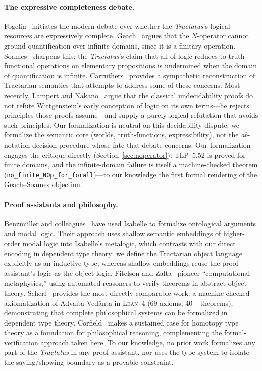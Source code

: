 \documentclass[jsl,bibother]{asl}
\theoremstyle{definition}
\theoremstyle{remark}
\newcommand{\Lean}{\textsc{Lean}}
\begin{document}
\paragraph{The expressive completeness debate.}
Fogelin~\cite{fogelin1987} initiates the modern debate over
whether the \emph{Tractatus}'s logical resources are
expressively complete.  Geach~\cite{geach1981} argues that the
$N$-operator cannot ground quantification over infinite domains,
since it is a finitary operation.
Soames~\cite{soames1983} sharpens this: the \emph{Tractatus}'s
claim that all of logic reduces to truth-functional operations
on elementary propositions is undermined when the domain of
quantification is infinite.
Carruthers~\cite{carruthers1989} provides a sympathetic
reconstruction of Tractarian semantics that attempts to address
some of these concerns.
Most recently, Lampert and Nakano~\cite{lampert2025} argue that
the classical undecidability proofs do not refute Wittgenstein's
early conception of logic on its own terms---he rejects
principles those proofs assume---and supply a purely logical
refutation that avoids such principles.  Our formalization is
neutral on this decidability dispute: we formalize the semantic
core (worlds, truth-functions, expressibility), not the
\emph{ab}-notation decision procedure whose fate that debate
concerns.
Our formalization engages the critique directly
(Section~\ref{sec:noperator}): TLP~5.52 is proved for finite
domains, and the infinite-domain failure is itself a
machine-checked theorem
(\texttt{no\_finite\_NOp\_for\_forall})---to our knowledge the
first formal rendering of the Geach--Soames objection.

\paragraph{Proof assistants and philosophy.}
Benzm\"uller and colleagues~\cite{benzmuller2017} have used
Isabelle to formalize ontological arguments and modal logic.
Their approach uses shallow semantic embeddings of higher-order
modal logic into Isabelle's metalogic, which contrasts with our
direct encoding in dependent type theory: we define the
Tractarian object language explicitly as an inductive type,
whereas shallow embeddings reuse the proof assistant's logic
as the object logic.
Fitelson and Zalta~\cite{fitelson2007} pioneer ``computational
metaphysics,'' using automated reasoners to verify theorems
in abstract-object theory.
Scherf~\cite{scherf2025} provides the most directly comparable
work: a machine-checked axiomatization of Advaita Ved\=anta in
\Lean~4 (69 axioms, 40+ theorems), demonstrating that complete
philosophical systems can be formalized in dependent type
theory.
Corfield~\cite{corfield2020} makes a sustained case for
homotopy type theory as a foundation for philosophical
reasoning, complementing the formal-verification approach
taken here.
To our knowledge, no prior work formalizes any part of the
\emph{Tractatus} in any proof assistant, nor uses the type
system to isolate the saying/showing boundary as a provable
constraint.
\end{document}
